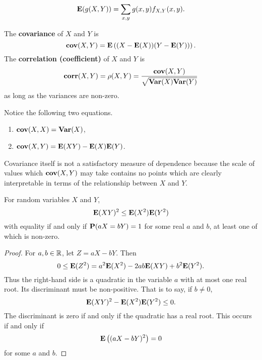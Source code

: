 \begin{lemma}
\begin{equation*}
    \mathbf{E}(g(X, Y))=\sum_{x, y} g(x, y) f_{X, Y}(x, y).
\end{equation*}
\end{lemma}

\begin{definition}
The \textbf{covariance} of $X$ and $Y$ is
\begin{equation*}
    \mathbf{cov}(X,Y) = \mathbf{E}\left( (X-\mathbf{E}(X))(Y-\mathbf{E}(Y)) \right).
\end{equation*}
The \textbf{correlation (coefficient)} of $X$ and $Y$ is 
\begin{equation*}
\mathbf{corr}(X, Y) = \rho(X,Y) = \frac{\mathbf{cov}(X,Y)}{\sqrt{\mathbf{Var}(X)\mathbf{Var}(Y)}}
\end{equation*}
as long as the variances are non-zero. 
\end{definition}

\begin{remark}
Notice the following two equations.
\begin{enumerate}
    \item $\mathbf{cov}(X,X) = \mathbf{Var}(X)$,
    \item $\mathbf{cov}(X,Y) = \mathbf{E}(XY) - \mathbf{E}(X)\mathbf{E}(Y)$.
\end{enumerate}
\end{remark}

Covariance itself is not a satisfactory measure of dependence because the scale of values which $\mathbf{cov}(X, Y)$ may take contains no points which are clearly interpretable in terms of the relationship between $X$ and $Y$.

\begin{theorem} For random variables $X$ and $Y$, 
\begin{equation*}
    \mathbf{E}(XY)^2 \leq \mathbf{E}(X^2) \mathbf{E}(Y^2)
\end{equation*} 
with equality if and only if $\mathbf{P}(aX = bY) = 1$ for some real $a$ and $b$, at least one of which is non-zero. 
\end{theorem}

\begin{proof}
For $a, b \in \mathbb{R}$, let $Z = aX - bY$. Then 
\begin{equation*}
    0 \leq \mathbf{E}(Z^2) = a^2 \mathbf{E}(X^2) - 2ab\mathbf{E}(XY) + b^2\mathbf{E}(Y^2).
\end{equation*}
Thus the right-hand side is a quadratic in the variable $a$ with at most one real root. Its discriminant must be non-positive. That is to say, if $b \neq 0$, 
\begin{equation*}
    \mathbf{E}(XY)^2 - \mathbf{E}(X^2) \mathbf{E}(Y^2) \leq 0. 
\end{equation*}
The discriminant is zero if and only if the quadratic has a real root. This occurs if and only if 
\begin{equation*}
    \mathbf{E}\left( (aX-bY)^2 \right) = 0
\end{equation*}
for some $a$ and $b$.
\end{proof}

